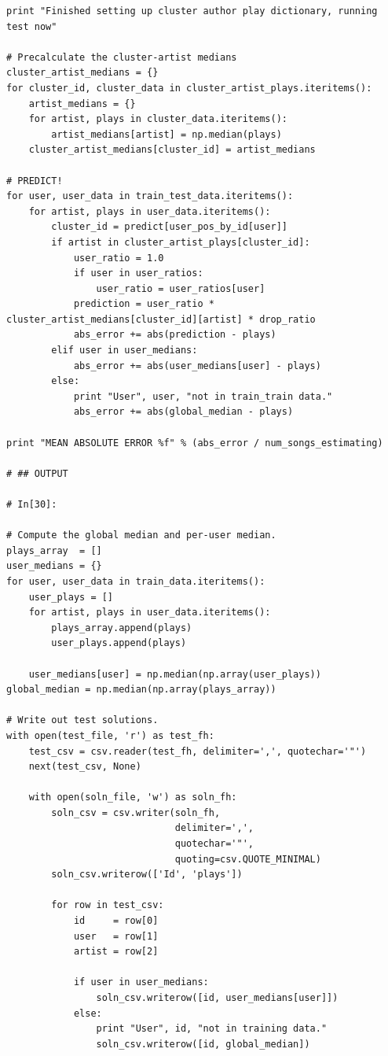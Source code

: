 \documentclass[11pt]{article}
\begin{document}
\begin{lstlisting}
print "Finished setting up cluster author play dictionary, running test now"

# Precalculate the cluster-artist medians
cluster_artist_medians = {}
for cluster_id, cluster_data in cluster_artist_plays.iteritems():
    artist_medians = {}
    for artist, plays in cluster_data.iteritems():
        artist_medians[artist] = np.median(plays)
    cluster_artist_medians[cluster_id] = artist_medians

# PREDICT!
for user, user_data in train_test_data.iteritems():
    for artist, plays in user_data.iteritems():
        cluster_id = predict[user_pos_by_id[user]]
        if artist in cluster_artist_plays[cluster_id]:
            user_ratio = 1.0
            if user in user_ratios:
                user_ratio = user_ratios[user]
            prediction = user_ratio * cluster_artist_medians[cluster_id][artist] * drop_ratio
            abs_error += abs(prediction - plays)
        elif user in user_medians:
            abs_error += abs(user_medians[user] - plays)
        else:
            print "User", user, "not in train_train data."
            abs_error += abs(global_median - plays)
            
print "MEAN ABSOLUTE ERROR %f" % (abs_error / num_songs_estimating)

# ## OUTPUT

# In[30]:

# Compute the global median and per-user median.
plays_array  = []
user_medians = {}
for user, user_data in train_data.iteritems():
    user_plays = []
    for artist, plays in user_data.iteritems():
        plays_array.append(plays)
        user_plays.append(plays)

    user_medians[user] = np.median(np.array(user_plays))
global_median = np.median(np.array(plays_array))

# Write out test solutions.
with open(test_file, 'r') as test_fh:
    test_csv = csv.reader(test_fh, delimiter=',', quotechar='"')
    next(test_csv, None)

    with open(soln_file, 'w') as soln_fh:
        soln_csv = csv.writer(soln_fh,
                              delimiter=',',
                              quotechar='"',
                              quoting=csv.QUOTE_MINIMAL)
        soln_csv.writerow(['Id', 'plays'])

        for row in test_csv:
            id     = row[0]
            user   = row[1]
            artist = row[2]

            if user in user_medians:
                soln_csv.writerow([id, user_medians[user]])
            else:
                print "User", id, "not in training data."
                soln_csv.writerow([id, global_median])
                

\end{lstlisting}
\end{document}
